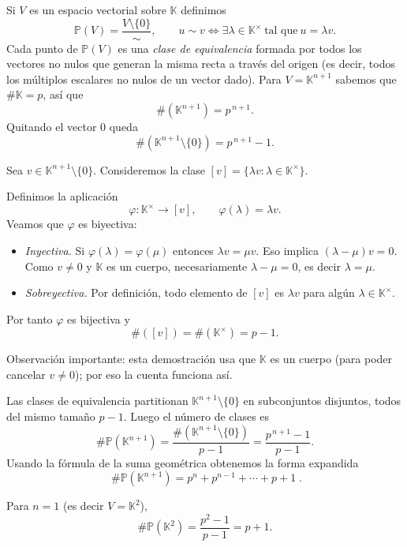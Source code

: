 
{
    Si \(V\) es un espacio vectorial sobre \(\mathbb{K}\) definimos
    \[
    \mathbb{P}(V)=\frac{V\setminus\{0\}}{\sim},
    \qquad
    u\sim v\iff \exists \lambda\in\mathbb{K}^\times\ \text{tal que}\ u=\lambda v.
    \]
    Cada punto de \(\mathbb{P}(V)\) es una \emph{clase de equivalencia} formada por todos los vectores no nulos que generan la misma recta a través del origen (es decir, todos los múltiplos escalares no nulos de un vector dado).
    Para \(V=\mathbb{K}^{n+1}\) sabemos que \(\#\mathbb{K}=p\), así que
    \[
    \#(\mathbb{K}^{n+1})=p^{\,n+1}.
    \]
    Quitando el vector \(0\) queda
    \[
    \#(\mathbb{K}^{n+1}\setminus\{0\})=p^{\,n+1}-1.
    \]
    
    Sea \(v\in\mathbb{K}^{n+1}\setminus\{0\}\). Consideremos la clase
    \([v]=\{\lambda v:\lambda\in\mathbb{K}^\times\}.\)
    
    Definimos la aplicación
    \[
    \varphi:\mathbb{K}^\times\longrightarrow [v],\qquad \varphi(\lambda)=\lambda v.
    \]
    Veamos que \(\varphi\) es biyectiva:
    \begin{itemize}
      \item \emph{Inyectiva.} Si \(\varphi(\lambda)=\varphi(\mu)\) entonces \(\lambda v=\mu v\). Eso implica \((\lambda-\mu)v=0\). Como \(v\neq 0\) y \(\mathbb{K}\) es un cuerpo, necesariamente \(\lambda-\mu=0\), es decir \(\lambda=\mu\).
      \item \emph{Sobreyectiva.} Por definición, todo elemento de \([v]\) es \(\lambda v\) para algún \(\lambda\in\mathbb{K}^\times\).
    \end{itemize}
    Por tanto \(\varphi\) es bijectiva y
    \[
    \#([v])=\#(\mathbb{K}^\times)=p-1.
    \]
    
    Observación importante: esta demostración usa que \(\mathbb{K}\) es un cuerpo (para poder cancelar \(v\neq 0\)); por eso la cuenta funciona así.
    
    Las clases de equivalencia partitionan \( \mathbb{K}^{n+1}\setminus\{0\}\) en subconjuntos disjuntos, todos del mismo tamaño \(p-1\). Luego el número de clases es
    \[
    \#\mathbb{P}(\mathbb{K}^{n+1})=\frac{\#(\mathbb{K}^{n+1}\setminus\{0\})}{p-1}
    =\frac{p^{\,n+1}-1}{p-1}.
    \]
    Usando la fórmula de la suma geométrica obtenemos la forma expandida
    \[
    \boxed{\;\#\mathbb{P}(\mathbb{K}^{n+1})=p^n+p^{n-1}+\cdots+p+1\; }.
    \]
    
    Para \(n=1\) (es decir \(V=\mathbb{K}^2\)),
    \[
    \#\mathbb{P}(\mathbb{K}^2)=\frac{p^{2}-1}{p-1}=p+1.
    \]
}


